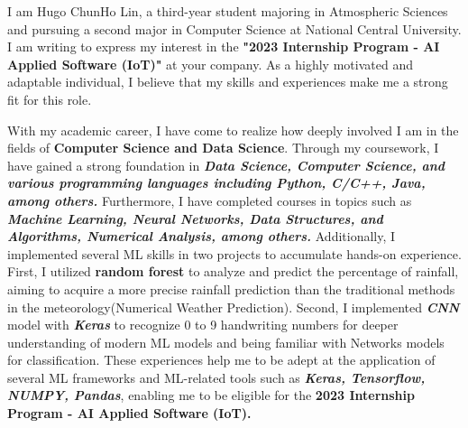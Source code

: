 
I am Hugo ChunHo Lin, a third-year student majoring in Atmospheric Sciences and pursuing a second major in Computer Science at National Central University. I am writing to express my interest in the \textbf{"2023 Internship Program - AI Applied Software (IoT)"} at your company. As a highly motivated and adaptable individual, I believe that my skills and experiences make me a strong fit for this role.

With my academic career, I have come to realize how deeply involved I am in the fields of \textbf{Computer Science and Data Science}. Through my coursework, I have gained a strong foundation in \textit{\textbf{Data Science, Computer Science, and various programming languages including Python, C/C++, Java, among others.}} Furthermore, I have completed courses in topics such as \textit{\textbf{Machine Learning, Neural Networks, Data Structures, and Algorithms, Numerical Analysis, among others.}}
Additionally, I implemented several ML skills in two projects to accumulate hands-on experience. 
First, I utilized \textbf{random forest} to analyze and predict the percentage of rainfall, aiming to acquire a more precise rainfall prediction than the traditional methods in the meteorology(Numerical Weather Prediction). 
Second, I implemented \textit{\textbf{CNN}} model with \textit{\textbf{Keras}} to recognize 0 to 9 handwriting numbers for deeper understanding of modern ML models and being familiar with Networks models for classification. 
These experiences help me to be adept at the application of several ML frameworks and ML-related tools such as \textbf{\textit{Keras, Tensorflow, NUMPY, Pandas}}, enabling me to be eligible for the \textbf{2023 Internship Program - AI Applied Software (IoT).} 

